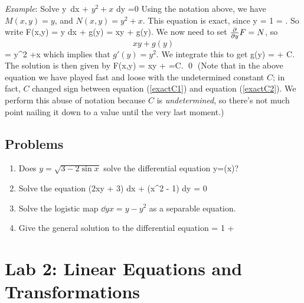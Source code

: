 \documentclass[12pt]{article}
\begin{document}
\noindent\emph{Example}: Solve 
\be 
  y\, dx + \(y^2 + x \) dy =0
\ee
Using the notation above, we have $M(x,y)=y$, and $N(x,y)=y^2 +x$.
This equation is exact, since 
\be  
  y = 1 = .
\ee
So write
\be 
  F(x,y) 
  = \int y dx + g(y)
  = xy + g(y).
\ee
We now need to set $\frac{\partial }{\partial y} F = N$, so
\be 
  \[xy + g(y)\] = y^2 +x 
\ee
which implies that $g'(y) = y^2$. We integrate this to get 
\be \label{exactC1}
  g(y) =  + C. 
\ee
The solution is then given by
\be \label{exactC2}
  F(x,y) = xy +  =C. \qed
\ee
(Note that in the above equation we have played fast and loose with the
undetermined constant $C$; in fact, $C$ changed sign between equation
(\ref{exactC1}) and equation (\ref{exactC2}). We perform this abuse of notation
because $C$ is \emph{undetermined}, so there's not much point nailing it
down to a value until the very last moment.)

\subsection{Problems}

\begin{enumerate}
\item
  Does $y = \sqrt{3-2\sin x}$ solve the differential equation 
  \bee
  y=\sin(x)?
  \eee

\item
  Solve the equation
  \bee
  (2xy + 3) dx + (x^2 - 1) dy = 0
  \eee

\item 
  Solve the logistic map $\dd{y}{x} = y - y^2$ as a separable equation.

\item
  Give the general solution to the differential equation
  \be
   = 1 + 
  \ee

\end{enumerate}


\newpage
\section{Lab 2: Linear Equations and Transformations}
\end{document}

